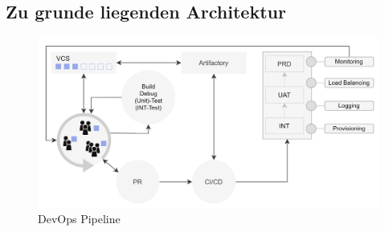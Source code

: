 \documentclass[11pt]{article}
\begin{document}
\subsection{Zu grunde liegenden Architektur}
\begin{figure}[H]
\caption{DevOps Pipeline}
\label{fig:devops}
\centering
\includegraphics[width=1\textwidth]{DevOps}
\end{figure}
\end{document}
